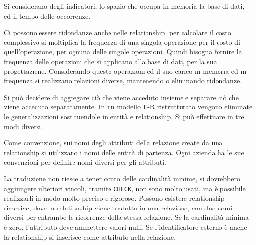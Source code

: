 \documentclass{article}
\numberwithin{equation}{subsection}
\begin{document}
Si considerano degli indicatori, lo spazio che occupa in memoria la base di dati, ed il tempo delle occorrenze. %

Ci possono essere ridondanze anche nelle relationship. %
per calcolare il costo complessivo si moltiplica la frequenza di una singola operazione per il costo di quell'operazione, per ognuna delle singole operazioni. Quindi 
bisogna fornire la frequenza delle operazioni che si applicano alla base di dati, per la sua progettazione. Considerando questo operazioni ed il suo 
carico in memoria ed in frequenza si realizzano relazioni diverse, mantenendo o eliminando ridondanze. 

Si può decidere di aggregare ciò che viene acceduto insieme e separare ciò che viene acceduto separatamente. In un modello E-R ristrutturato vengono eliminate le 
generalizzazioni sostituendole in entità e relationship. Si può effettuare in tre modi diversi. %


Come convenzione, sui nomi degli attributi della relazione create da una relationship si utilizzano i nomi delle entità di partenza. Ogni azienda ha le sue convenzioni 
per definire nomi diversi per gli attributi. 

La traduzione non riesce a tener conto delle cardinalità minime, si dovrebbero aggiungere ulteriori vincoli, tramite \verb|CHECK|, non sono molto usati, ma è possibile 
realizzarli in modo molto preciso e rigoroso. Possono esistere relationship ricorsive, dove la relationship viene tradotta in una relazione, con due nomi diversi per 
entrambe le ricorrenze della stessa relazione. 
Se la cardinalità minima è zero, l'attributo deve ammettere valori nulli. 
Se l'identificatore esterno è anche la relationship si inserisce come attributo nella relazione. 
\end{document}
